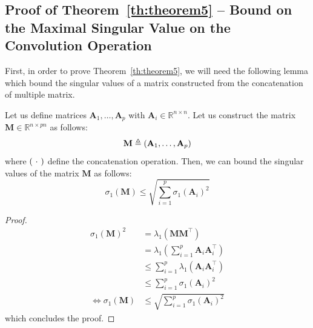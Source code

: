 \subsection{Proof of Theorem~\ref{th:theorem5} -- Bound on the Maximal Singular Value on the Convolution Operation}

First, in order to prove Theorem~\ref{th:theorem5}, we will need the following lemma which bound the singular values of a matrix constructed from the concatenation of multiple matrix. 

\begin{lemma}\label{appendix-th:bound_concatenation_matrices}
Let us define matrices $\mathbf{A}_1, \dots, \mathbf{A}_p$ with $\mathbf{A}_i \in \mathbb{R}^{n \times n}$. Let us construct the matrix $\mathbf{M} \in \mathbb{R}^{n \times pn}$ as follows:
\begin{equation}
    \mathbf{M} \triangleq \leftmat \mathbf{A}_1, \dots, \mathbf{A}_p \rightmat
\end{equation}
where $\leftmat\ \cdot\ \rightmat$ define the concatenation operation. Then, we can bound the singular values of the matrix $\mathbf{M}$ as follows:
\begin{equation}
    \sigma_1(\mathbf{M}) \leq \sqrt{\sum_{i=1}^p \sigma_1(\mathbf{A}_i)^2}
\end{equation}
\end{lemma}
\begin{proof}
\begin{align}
    \sigma_1\left(\mathbf{M}\right)^2 &= \lambda_1\left(\mathbf{M} \mathbf{M}^\top\right) \\
    &= \lambda_1\left( \sum_{i=1}^p\mathbf{A}_i \mathbf{A}_i^\top  \right) \\
    &\leq \sum_{i=1}^p \lambda_1\left( \mathbf{A}_i \mathbf{A}_i^\top  \right) \\
    &\leq \sum_{i=1}^p \sigma_1\left( \mathbf{A}_i \right)^2 \\
    \Leftrightarrow \sigma_1\left(\mathbf{M}\right) &\leq \sqrt{\sum_{i=1}^p \sigma_1(\mathbf{A}_i)^2}
\end{align}
which concludes the proof.
\end{proof}


